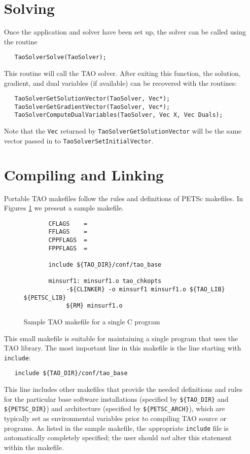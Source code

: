 \section{Solving}
Once the application and solver have been set up, the solver can be called using the routine
\begin{verbatim}
   TaoSolverSolve(TaoSolver);
\end{verbatim}
\noindent
This  routine will call the TAO solver. 
After exiting this function, the solution, gradient, and dual variables (if
available) can be
recovered with the routines:
\begin{verbatim}
   TaoSolverGetSolutionVector(TaoSolver, Vec*);
   TaoSolverGetGradientVector(TaoSolver, Vec*);
   TaoSolverComputeDualVariables(TaoSolver, Vec X, Vec Duals);
\end{verbatim}
\noindent
Note that the {\tt Vec} returned by {\tt TaoSolverGetSolutionVector} will be
the same vector passed in to {\tt TaoSolverSetInitialVector}.



\section{Compiling and Linking}

Portable TAO makefiles follow the rules and definitions
of PETSc makefiles.
In Figures \ref{fig:make3} we present a sample makefile.

\begin{figure}[tbh]
{\footnotesize
\begin{verbatim}   
       CFLAGS    = 
       FFLAGS    = 
       CPPFLAGS  =
       FPPFLAGS  =
       
       include ${TAO_DIR}/conf/tao_base
   
       minsurf1: minsurf1.o tao_chkopts
            -${CLINKER} -o minsurf1 minsurf1.o ${TAO_LIB} ${PETSC_LIB}
            ${RM} minsurf1.o
\end{verbatim} 
\noindent
}
\caption{Sample TAO makefile for a single C program}
\label{fig:make3}
\end{figure}

This small makefile is suitable for maintaining a single program that
uses the TAO library.  The most important line in this makefile is the
line starting with {\tt include}:

\begin{verbatim}
   include ${TAO_DIR}/conf/tao_base
\end{verbatim}
\noindent %
This line includes other makefiles that provide the needed definitions
and rules for the particular base software installations (specified by
{\tt \$\{TAO\_DIR\}} and {\tt \$\{PETSC\_DIR\}}) and architecture
(specified by {\tt \$\{PETSC\_ARCH\}}), which are typically set as
environmental variables prior to compiling TAO source or programs.  As
listed in the sample makefile, the appropriate {\tt include} file is
automatically completely specified; the user should {\em not} alter
this statement within the makefile.
 
